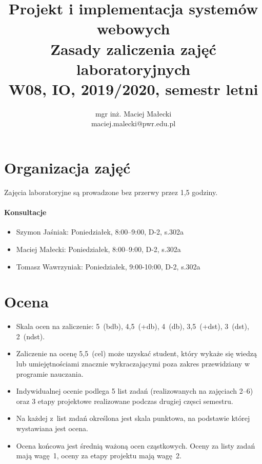 \documentclass[12pt]{article}
\title{Projekt i implementacja systemów webowych\\
    \large Zasady zaliczenia zajęć laboratoryjnych\\
    \large W08, IO, 2019/2020, semestr letni}
\author{mgr inż. Maciej Małecki\\ \small maciej.malecki@pwr.edu.pl}
\begin{document}
    \maketitle

    \section*{Organizacja zajęć}
        Zajęcia laboratoryjne są prowadzone bez przerwy przez 1,5 godziny.
        \paragraph*{Konsultacje}
        \begin{itemize}
			\item Szymon Jaśniak: Poniedziałek, 8:00--9:00, D-2, s.302a
            \item Maciej Małecki: Poniedziałek, 8:00--9:00, D-2, s.302a
			\item Tomasz Wawrzyniak: Poniedziałek, 9:00-10:00, D-2, s.302a
        \end{itemize}
    \section*{Ocena}
        \begin{itemize}
            \item Skala ocen na zaliczenie: 5~(bdb), 4,5~(+db), 4~(db), 3,5~(+dst), 3~(dst), 2~(ndst).
            \item Zaliczenie na ocenę 5,5~(cel) może uzyskać student, który wykaże się wiedzą lub umiejętnościami znacznie wykraczającymi poza zakres przewidziany w programie nauczania.
            \item Indywidualnej ocenie podlega 5 list zadań (realizowanych na zajęciach 2--6) oraz 3 etapy projektowe realizowane podczas drugiej częsci semestru.
            \item Na każdej z~list zadań określona jest skala punktowa, na podstawie której wystawiana jest ocena.
            \item Ocena końcowa jest średnią ważoną ocen cząstkowych. Oceny za listy zadań mają wagę~1, oceny za etapy projektu mają wagę~2.
        \end{itemize}
\end{document}
